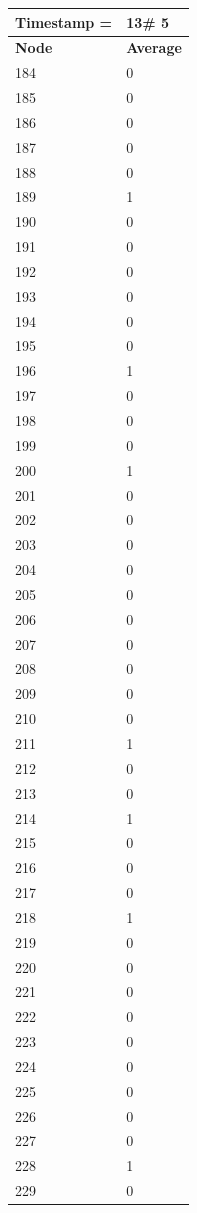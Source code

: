 \begin{tabular}{|l||l|}
\hline
\textbf{Timestamp =} & \textbf{13}\# 5\\\hline
	\textbf{Node} & \textbf{Average} \\ \hline
\hline
	184 & 0 \\ \hline
	185 & 0 \\ \hline
	186 & 0 \\ \hline
	187 & 0 \\ \hline
	188 & 0 \\ \hline
	189 & 1 \\ \hline
	190 & 0 \\ \hline
	191 & 0 \\ \hline
	192 & 0 \\ \hline
	193 & 0 \\ \hline
	194 & 0 \\ \hline
	195 & 0 \\ \hline
	196 & 1 \\ \hline
	197 & 0 \\ \hline
	198 & 0 \\ \hline
	199 & 0 \\ \hline
	200 & 1 \\ \hline
	201 & 0 \\ \hline
	202 & 0 \\ \hline
	203 & 0 \\ \hline
	204 & 0 \\ \hline
	205 & 0 \\ \hline
	206 & 0 \\ \hline
	207 & 0 \\ \hline
	208 & 0 \\ \hline
	209 & 0 \\ \hline
	210 & 0 \\ \hline
	211 & 1 \\ \hline
	212 & 0 \\ \hline
	213 & 0 \\ \hline
	214 & 1 \\ \hline
	215 & 0 \\ \hline
	216 & 0 \\ \hline
	217 & 0 \\ \hline
	218 & 1 \\ \hline
	219 & 0 \\ \hline
	220 & 0 \\ \hline
	221 & 0 \\ \hline
	222 & 0 \\ \hline
	223 & 0 \\ \hline
	224 & 0 \\ \hline
	225 & 0 \\ \hline
	226 & 0 \\ \hline
	227 & 0 \\ \hline
	228 & 1 \\ \hline
	229 & 0 \\ \hline
\end{tabular}

